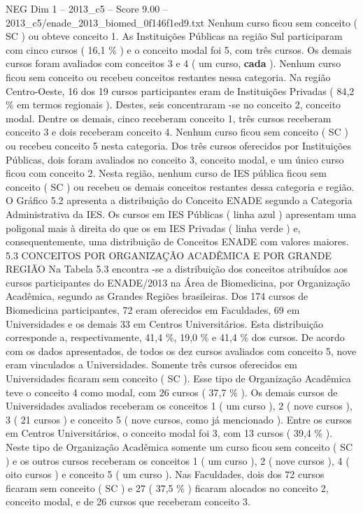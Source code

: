 \begin{textsample}{NEG Dim 1 – 2013\_c5 – Score 9.00 – 2013\_c5/enade\_2013\_biomed\_0f146f1ed9.txt}
Nenhum curso ficou sem conceito ( SC ) ou obteve conceito 1.
As Instituições Públicas na região Sul participaram com cinco cursos ( 16,1 \% ) e o conceito modal foi 5, com três cursos.
Os demais cursos foram avaliados com conceitos 3 e 4 ( um curso, \textbf{cada} ).
Nenhum curso ficou sem conceito ou recebeu conceitos restantes nessa categoria.
Na região Centro-Oeste, 16 dos 19 cursos participantes eram de Instituições Privadas ( 84,2 \% em termos regionais ).
Destes, seis concentraram -se no conceito 2, conceito modal.
Dentre os demais, cinco receberam conceito 1, três cursos receberam conceito 3 e dois receberam conceito 4.
Nenhum curso ficou sem conceito ( SC ) ou recebeu conceito 5 nesta categoria.
Dos três cursos oferecidos por Instituições Públicas, dois foram avaliados no conceito 3, conceito modal, e um único curso ficou com conceito 2.
Nesta região, nenhum curso de IES pública ficou sem conceito ( SC ) ou recebeu os demais conceitos restantes dessa categoria e região.
O Gráfico 5.2 apresenta a distribuição do Conceito ENADE segundo a Categoria Administrativa da IES.
Os cursos em IES Públicas ( linha azul ) apresentam uma poligonal mais à direita do que os em IES Privadas ( linha verde ) e, consequentemente, uma distribuição de Conceitos ENADE com valores maiores. 5.3 CONCEITOS POR ORGANIZAÇÃO ACADÊMICA E POR GRANDE REGIÃO Na Tabela 5.3 encontra -se a distribuição dos conceitos atribuídos aos cursos participantes do ENADE/2013 na Área de Biomedicina, por Organização Acadêmica, segundo as Grandes Regiões brasileiras.
Dos 174 cursos de Biomedicina participantes, 72 eram oferecidos em Faculdades, 69 em Universidades e os demais 33 em Centros Universitários.
Esta distribuição corresponde a, respectivamente, 41,4 \%, 19,0 \% e 41,4 \% dos cursos.
De acordo com os dados apresentados, de todos os dez cursos avaliados com conceito 5, nove eram vinculados a Universidades.
Somente três cursos oferecidos em Universidades ficaram sem conceito ( SC ).
Esse tipo de Organização Acadêmica teve o conceito 4 como modal, com 26 cursos ( 37,7 \% ).
Os demais cursos de Universidades avaliados receberam os conceitos 1 ( um curso ), 2 ( nove cursos ), 3 ( 21 cursos ) e conceito 5 ( nove cursos, como já mencionado ).
Entre os cursos em Centros Universitários, o conceito modal foi 3, com 13 cursos ( 39,4 \% ).
Neste tipo de Organização Acadêmica somente um curso ficou sem conceito ( SC ) e os outros cursos receberam os conceitos 1 ( um curso ), 2 ( nove cursos ), 4 ( oito cursos ) e conceito 5 ( um curso ).
Nas Faculdades, dois dos 72 cursos ficaram sem conceito ( SC ) e 27 ( 37,5 \% ) ficaram alocados no conceito 2, conceito modal, e de 26 cursos que receberam conceito 3.

\end{textsample}

